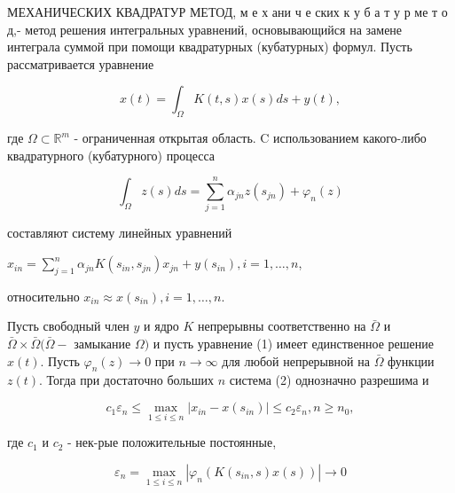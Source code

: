 \documentclass[10pt]{article}
\begin{document}
МЕХАНИЧЕСКИХ КВАДРАТУР МЕТОД, м е х ани ч е ских к у б а т у р ме т о д,- метод решения интегральных уравнений, основывающийся на замене интеграла суммой при помощи квадратурных (кубатурных) формул. Пусть рассматривается уравнение



\[

x(t)=\int_{\Omega} K(t, s) x(s) d s+y(t),

\]



где $\Omega \subset \mathbb{R}^{m}$ - ограниченная открытая область. $\mathrm{C}$ использованием какого-либо квадратурного (кубатурного) процесса



\[

\int_{\Omega} z(s) d s=\sum_{j=1}^{n} \alpha_{j n} z\left(s_{j n}\right)+\varphi_{n}(z)

\]



составляют систему линейных уравнений



$x_{i n}=\sum_{j=1}^{n} \alpha_{j n} K\left(s_{i n}, s_{j n}\right) x_{j n}+y\left(s_{i n}\right), i=1, \ldots, n$,



относительно $x_{i n} \approx x\left(s_{i n}\right), i=1, \ldots, n$.



Пусть свободный член $y$ и ядро $K$ непрерывны соответственно на $\bar{\Omega}$ и $\bar{\Omega} \times \bar{\Omega}(\bar{\Omega}-$ замыкание $\Omega)$ и пусть уравнение (1) имеет единственное решение $x(t)$. Пусть $\varphi_{n}(z) \rightarrow 0$ при $n \rightarrow \infty$ для любой непрерывной на $\bar{\Omega}$ функции $z(t)$. Тогда при достаточно больших $n$ система (2) однозначно разрешима и



\[

c_{1} \varepsilon_{n} \leqslant \max _{1 \leqslant i \leqslant n}\left|x_{i n}-x\left(s_{i n}\right)\right| \leqslant c_{2} \varepsilon_{n}, n \geqslant n_{0},

\]



где $c_{1}$ и $c_{2}$ - нек-рые положительные постоянные,



\[

\varepsilon_{n}=\max _{1 \leqslant i \leqslant n}\left|\varphi_{n}\left(K\left(s_{i n}, s\right) x(s)\right)\right| \longrightarrow 0

\]
\end{document}
